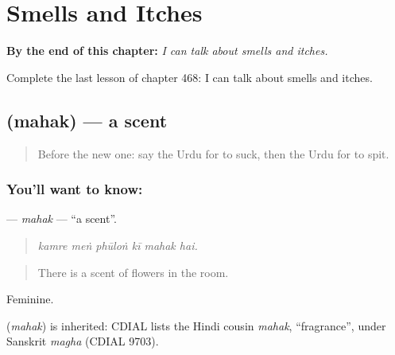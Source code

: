 
\chapter{Smells and Itches}
\label{ch:ur-smells-and-itches}

\begin{chapteropening}
\textbf{By the end of this chapter:} \emph{I can talk about smells and itches.}

Complete the last lesson of chapter 468: I can talk about smells and itches.
\end{chapteropening}

\section[\texorpdfstring{\ur{مہک} (mahak)}{مہک (mahak)}]{ (mahak) — a scent}

\label{lesson:UR-C468-mahak}



\begin{quote}
Before the new one: say the Urdu for to suck, then the Urdu for to spit.
\end{quote}

\subsection*{You'll want to know: }
\textbf{} — \emph{mahak} — \textquotedblleft{}a scent\textquotedblright{}.

\begin{quote}
     
\end{quote}

\begin{quote}
\emph{kamre meṅ phūloṅ kī mahak hai.}
\end{quote}

\begin{quote}
There is a scent of flowers in the room.
\end{quote}

Feminine.

\begin{cousinweb}
\textbf{} (\emph{mahak}) is inherited: CDIAL lists the Hindi cousin \emph{mahak}, \textquotedblleft{}fragrance\textquotedblright{}, under Sanskrit \emph{magha} (CDIAL 9703).
\end{cousinweb}

